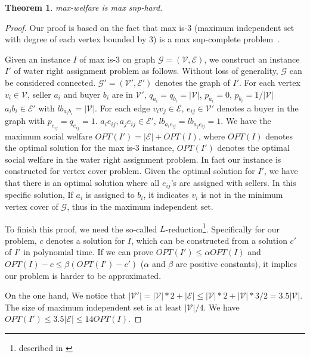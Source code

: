 \documentclass{aamas2015}
\newtheorem{theorem}{Theorem}%
\begin{document}
\begin{theorem}
	{\sc max-welfare} is {\sc max snp-hard}. %
\end{theorem}
\begin{proof}
	Our proof is based on the fact that {\sc max is-3} (maximum independent set with degree of each vertex bounded by 3) is a {\sc max snp-complete} problem~\cite{berman1995approximation}.
	
	Given an instance $I$ of {\sc max is-3} on graph $\mathcal{G}=(\mathcal{V},\mathcal{E})$, we construct an instance $I'$ of water right assignment problem as follows.
	Without loss of generality, $\mathcal{G}$ can be considered connected.
	$\mathcal{G}'=(\mathcal{V}',\mathcal{E}')$  denotes the graph of $I'$.
	For each vertex $v_i\in \mathcal{V}$, seller $a_i$ and buyer $b_i$ are in $\mathcal{V}'$,
	$q_{a_i}=q_{b_i}=|\mathcal{V}|$, $p_{a_i}=0$, $p_{b_i}=1/|\mathcal{V}|$ $a_ib_i\in \mathcal{E}'$ with $lb_{a_ib_i}=|\mathcal{V}|$.
	For each edge $v_iv_j\in \mathcal{E}$, $e_{ij}\in \mathcal{V}'$ denotes a buyer in the graph  with $p_{e_{ij}}=q_{e_{ij}}=1$.
	$a_ie_{ij},a_je_{ij}\in \mathcal{E}'$, $lb_{a_ie_{ij}}=lb_{a_je_{ij}}=1$.
	We have the maximum social welfare $OPT(I')=|\mathcal{E}|+OPT(I)$, where $OPT(I)$ denotes the optimal solution for the {\sc max is-3} instance, $OPT(I')$ denotes the optimal social welfare in the water right assignment problem.
	In fact our instance is constructed for vertex cover problem.
	Given the optimal solution for $I'$, we have that there is an optimal solution where all $e_{ij}$'s are assigned with sellers. In this specific solution, If $a_i$ is assigned to $b_i$, it indicates $v_i$ is not in the minimum vertex cover of $\mathcal{G}$, thus in the maximum independent set.
	
	To finish this proof, we need the so-called $L$-reduction\footnote{described in \cite{papadimitriou1991optimization}}. Specifically for our problem, $c$ denotes a solution for $I$, which can be constructed from a solution $c'$ of $I'$ in polynomial time. If we can prove $OPT(I')\leq \alpha OPT(I)$ and $OPT(I)-c\leq \beta(OPT(I')-c')$ ($\alpha$ and $\beta$ are positive constants), it implies our problem is harder to be approximated.
	
	On the one hand,
	We notice that $|\mathcal{V}'|=|\mathcal{V}|*2+|\mathcal{E}|\leq |\mathcal{V}|*2+|\mathcal{V}|*3/2=3.5|\mathcal{V}|$.
	The size of maximum independent set is at least $|\mathcal{V}|/4$.
	We have $OPT(I')\leq 3.5|\mathcal{E}|\leq 14OPT(I)$.
	

\end{proof}
\end{document}
